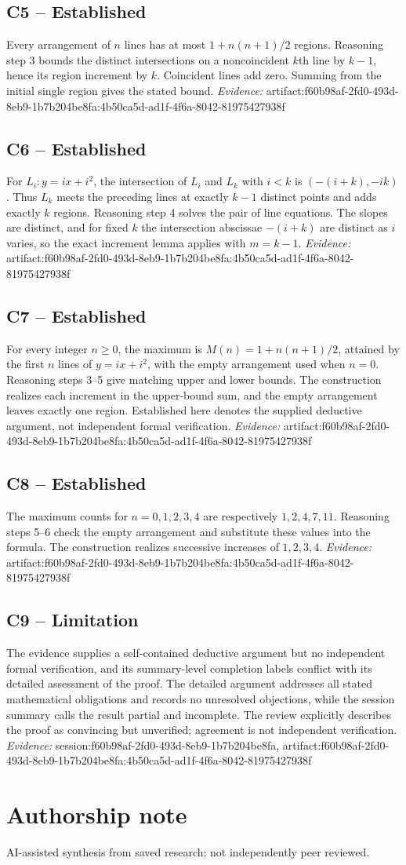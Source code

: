 \documentclass[11pt]{article}
\begin{document}
\subsection{C5 -- Established}
Every arrangement of $n$ lines has at most $1+n(n+1)/2$ regions.
Reasoning step 3 bounds the distinct intersections on a noncoincident $k$th line by $k-1$, hence its region increment by $k$. Coincident lines add zero. Summing from the initial single region gives the stated bound.
\textit{Evidence: }artifact:f60b98af-2fd0-493d-8eb9-1b7b204be8fa:4b50ca5d-ad1f-4f6a-8042-81975427938f
\subsection{C6 -- Established}
For $L_i: y=ix+i^2$, the intersection of $L_i$ and $L_k$ with $i<k$ is $(-(i+k),-ik)$. Thus $L_k$ meets the preceding lines at exactly $k-1$ distinct points and adds exactly $k$ regions.
Reasoning step 4 solves the pair of line equations. The slopes are distinct, and for fixed $k$ the intersection abscissae $-(i+k)$ are distinct as $i$ varies, so the exact increment lemma applies with $m=k-1$.
\textit{Evidence: }artifact:f60b98af-2fd0-493d-8eb9-1b7b204be8fa:4b50ca5d-ad1f-4f6a-8042-81975427938f
\subsection{C7 -- Established}
For every integer $n\geq 0$, the maximum is $M(n)=1+n(n+1)/2$, attained by the first $n$ lines of $y=ix+i^2$, with the empty arrangement used when $n=0$.
Reasoning steps 3–5 give matching upper and lower bounds. The construction realizes each increment in the upper-bound sum, and the empty arrangement leaves exactly one region. Established here denotes the supplied deductive argument, not independent formal verification.
\textit{Evidence: }artifact:f60b98af-2fd0-493d-8eb9-1b7b204be8fa:4b50ca5d-ad1f-4f6a-8042-81975427938f
\subsection{C8 -- Established}
The maximum counts for $n=0,1,2,3,4$ are respectively $1,2,4,7,11$.
Reasoning steps 5–6 check the empty arrangement and substitute these values into the formula. The construction realizes successive increases of $1,2,3,4$.
\textit{Evidence: }artifact:f60b98af-2fd0-493d-8eb9-1b7b204be8fa:4b50ca5d-ad1f-4f6a-8042-81975427938f
\subsection{C9 -- Limitation}
The evidence supplies a self-contained deductive argument but no independent formal verification, and its summary-level completion labels conflict with its detailed assessment of the proof.
The detailed argument addresses all stated mathematical obligations and records no unresolved objections, while the session summary calls the result partial and incomplete. The review explicitly describes the proof as convincing but unverified; agreement is not independent verification.
\textit{Evidence: }session:f60b98af-2fd0-493d-8eb9-1b7b204be8fa, artifact:f60b98af-2fd0-493d-8eb9-1b7b204be8fa:4b50ca5d-ad1f-4f6a-8042-81975427938f
\section*{Authorship note}
AI-assisted synthesis from saved research; not independently peer reviewed.
\end{document}
